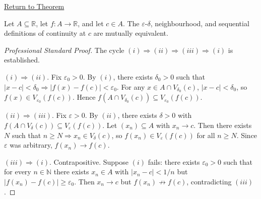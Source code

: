 \newpage
{}
\label{prf:continuity-three-equiv}

\begin{remark*}[Return]
\hyperref[thm:continuity-three-equiv]{Return to Theorem}
\end{remark*}

\begin{theorem*}
Let $A \subseteq \mathbb{R}$, let $f : A \to \mathbb{R}$, and let $c \in A$.
The $\varepsilon$-$\delta$, neighbourhood, and sequential definitions of
continuity at $c$ are mutually equivalent.
\end{theorem*}

\begin{proof}[Professional Standard Proof]
\LRAProofBodyStart

The cycle $(i) \Rightarrow (ii) \Rightarrow (iii) \Rightarrow (i)$ is established.

\medskip
\noindent$(i) \Rightarrow (ii)$. Fix $\varepsilon_0 > 0$. By $(i)$, there
exists $\delta_0 > 0$ such that $|x - c| < \delta_0 \Rightarrow
|f(x) - f(c)| < \varepsilon_0$. For any $x \in A \cap V_{\delta_0}(c)$,
$|x - c| < \delta_0$, so $f(x) \in V_{\varepsilon_0}(f(c))$. Hence
$f(A \cap V_{\delta_0}(c)) \subseteq V_{\varepsilon_0}(f(c))$.

\medskip
\noindent$(ii) \Rightarrow (iii)$. Fix $\varepsilon > 0$. By $(ii)$, there
exists $\delta > 0$ with $f(A \cap V_\delta(c)) \subseteq
V_\varepsilon(f(c))$. Let $(x_n) \subseteq A$ with $x_n \to c$. Then
there exists $N$ such that $n \geq N \Rightarrow x_n \in V_\delta(c)$,
so $f(x_n) \in V_\varepsilon(f(c))$ for all $n \geq N$. Since
$\varepsilon$ was arbitrary, $f(x_n) \to f(c)$.

\medskip
\noindent$(iii) \Rightarrow (i)$. Contrapositive. Suppose $(i)$ fails:
there exists $\varepsilon_0 > 0$ such that for every $n \in \mathbb{N}$
there exists $x_n \in A$ with $|x_n - c| < 1/n$ but $|f(x_n) - f(c)|
\geq \varepsilon_0$. Then $x_n \to c$ but $f(x_n) \not\to f(c)$,
contradicting $(iii)$.
\end{proof}

